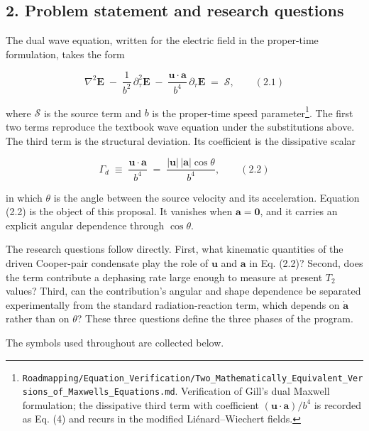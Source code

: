 \documentclass[
  11pt,
]{article}
\begin{document}
\hypertarget{problem-statement-and-research-questions}{%
\subsection{2. Problem statement and research
questions}\label{problem-statement-and-research-questions}}

The dual wave equation, written for the electric field in the
proper-time formulation, takes the form

\[
\nabla^2 \mathbf{E} \;-\; \frac{1}{b^2}\,\partial_\tau^2 \mathbf{E} \;-\; \frac{\mathbf{u}\!\cdot\!\mathbf{a}}{b^4}\,\partial_\tau \mathbf{E} \;=\; \mathcal{S}, \qquad (2.1)
\]

where \(\mathcal{S}\) is the source term and \(b\) is the proper-time
speed parameter\footnote{\texttt{Roadmapping/Equation\_Verification/Two\_Mathematically\_Equivalent\_Versions\_of\_Maxwells\_Equations.md}.
  Verification of Gill's dual Maxwell formulation; the dissipative third
  term with coefficient \((\mathbf{u}\!\cdot\!\mathbf{a})/b^4\) is
  recorded as Eq. (4) and recurs in the modified Liénard--Wiechert
  fields.}. The first two terms reproduce the textbook wave equation
under the substitutions above. The third term is the structural
deviation. Its coefficient is the dissipative scalar

\[
\Gamma_{\!d} \;\equiv\; \frac{\mathbf{u}\!\cdot\!\mathbf{a}}{b^4} \;=\; \frac{|\mathbf{u}|\,|\mathbf{a}|\cos\theta}{b^4}, \qquad (2.2)
\]

in which \(\theta\) is the angle between the source velocity and its
acceleration. Equation (2.2) is the object of this proposal. It vanishes
when \(\mathbf{a}=\mathbf{0}\), and it carries an explicit angular
dependence through \(\cos\theta\).

The research questions follow directly. First, what kinematic quantities
of the driven Cooper-pair condensate play the role of \(\mathbf{u}\) and
\(\mathbf{a}\) in Eq. (2.2)? Second, does the term contribute a
dephasing rate large enough to measure at present \(T_2\) values? Third,
can the contribution's angular and shape dependence be separated
experimentally from the standard radiation-reaction term, which depends
on \(\dot{\mathbf{a}}\) rather than on \(\theta\)? These three questions
define the three phases of the program.

The symbols used throughout are collected below.
\end{document}
